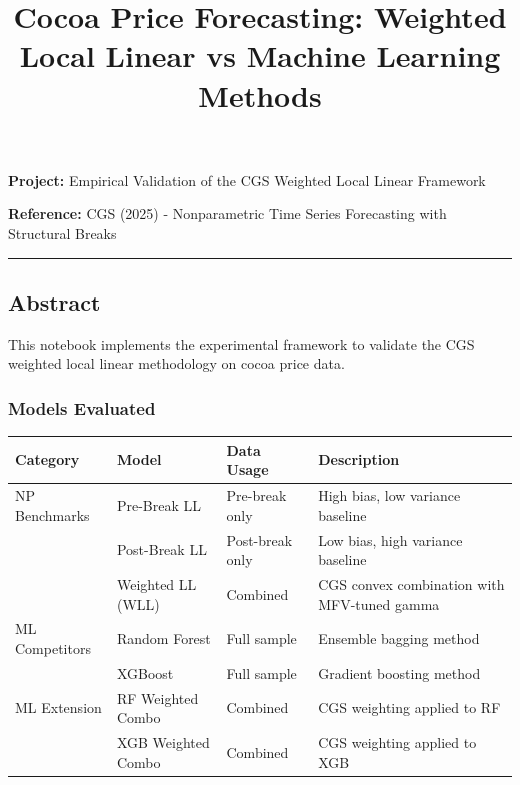 \documentclass[
  letterpaper,
  DIV=11,
  numbers=noendperiod]{scrartcl}
\title{Cocoa Price Forecasting: Weighted Local Linear vs Machine
Learning Methods}
\author{}
\date{}
\begin{document}
\maketitle


\textbf{Project:} Empirical Validation of the CGS Weighted Local Linear
Framework

\textbf{Reference:} CGS (2025) - Nonparametric Time Series Forecasting
with Structural Breaks

\begin{center}\rule{0.5\linewidth}{0.5pt}\end{center}

\subsection{Abstract}\label{abstract}

This notebook implements the experimental framework to validate the CGS
weighted local linear methodology on cocoa price data.

\subsubsection{Models Evaluated}\label{models-evaluated}

\begin{longtable}[]{@{}
  >{\raggedright\arraybackslash}p{}
  >{\raggedright\arraybackslash}p{}
  >{\raggedright\arraybackslash}p{}
  >{\raggedright\arraybackslash}p{}@{}}
\toprule\noalign{}
\begin{minipage}[b]{\linewidth}\raggedright
Category
\end{minipage} & \begin{minipage}[b]{\linewidth}\raggedright
Model
\end{minipage} & \begin{minipage}[b]{\linewidth}\raggedright
Data Usage
\end{minipage} & \begin{minipage}[b]{\linewidth}\raggedright
Description
\end{minipage} \\
\midrule\noalign{}
\endhead
\bottomrule\noalign{}
\endlastfoot
NP Benchmarks & Pre-Break LL & Pre-break only & High bias, low variance
baseline \\
& Post-Break LL & Post-break only & Low bias, high variance baseline \\
& Weighted LL (WLL) & Combined & CGS convex combination with MFV-tuned
gamma \\
ML Competitors & Random Forest & Full sample & Ensemble bagging
method \\
& XGBoost & Full sample & Gradient boosting method \\
ML Extension & RF Weighted Combo & Combined & CGS weighting applied to
RF \\
& XGB Weighted Combo & Combined & CGS weighting applied to XGB \\
\end{longtable}
\end{document}
